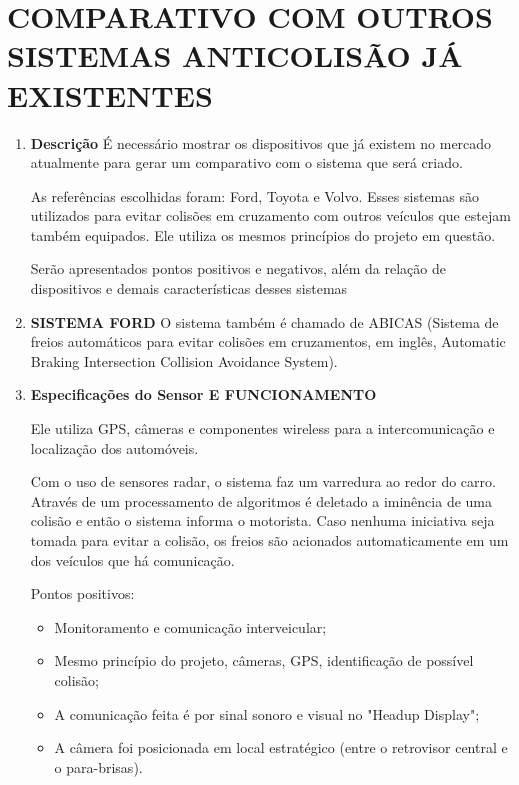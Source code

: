 \chapter[COMPARATIVO COM OUTROS SISTEMAS ANTICOLISÃO JÁ EXISTENTES]{COMPARATIVO COM OUTROS SISTEMAS ANTICOLISÃO JÁ EXISTENTES}
\begin{enumerate}
\item \textbf{Descrição}
É necessário mostrar os dispositivos que já existem no mercado atualmente para
gerar um comparativo com o sistema que será criado.

As referências escolhidas foram:  Ford, Toyota e Volvo. Esses sistemas
são utilizados para evitar colisões em cruzamento com outros  veículos  que
estejam também equipados.  Ele  utiliza  os  mesmos  princípios  do projeto em questão.

Serão apresentados pontos positivos e negativos, além da relação de dispositivos
e demais características desses sistemas

\item \textbf{ SISTEMA FORD}
O sistema também é chamado de ABICAS (Sistema de freios automáticos para evitar
colisões  em  cruzamentos,  em  inglês,   Automatic  Braking  Intersection
 Collision  Avoidance  System).

\item \textbf{Especificações do Sensor E FUNCIONAMENTO}

Ele  utiliza  GPS,  câmeras  e  componentes  wireless  para
a  intercomunicação e localização dos automóveis.

Com o uso de sensores radar, o sistema faz um varredura ao
 redor do carro. Através de um processamento de algoritmos é
 deletado a iminência de uma colisão e então o sistema informa
 o motorista. Caso nenhuma iniciativa seja tomada para evitar a
 colisão, os freios são acionados automaticamente em um dos veículos
 que há comunicação.


 Pontos positivos:

 \begin{itemize}
   \item Monitoramento e comunicação interveicular;
   \item Mesmo princípio do projeto, câmeras, GPS, identificação de possível colisão;
   \item A comunicação feita é por sinal sonoro e visual no "Headup Display";
   \item A  câmera  foi  posicionada  em  local  estratégico  (entre  o  retrovisor  central  e  o para-brisas).
 \end{itemize}


\end{enumerate}

